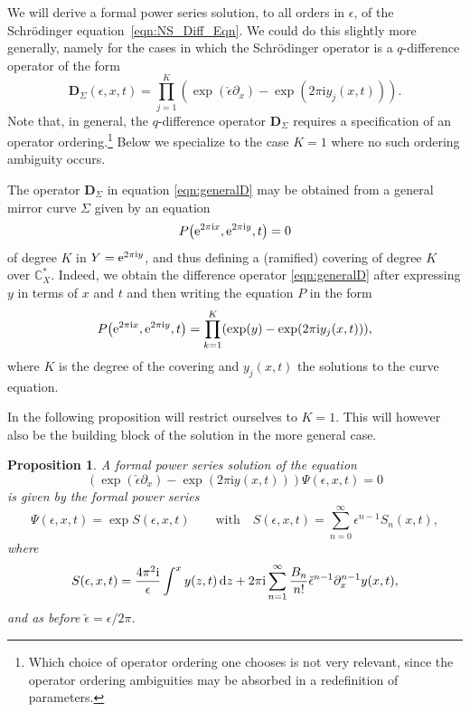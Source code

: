 \documentclass[pdftex]{sigma}
\numberwithin{equation}{section}
\newtheorem{Proposition}[Theorem]{Proposition}
 { \theoremstyle{definition}
\newtheorem{Definition}[Theorem]{Definition}
\newtheorem{Note}[Theorem]{Note}
\newtheorem{Example}[Theorem]{Example}
\newtheorem{Remark}[Theorem]{Remark} }
\begin{document}
We will derive a formal power series solution, to all orders in $\epsilon$, of the Schr\"odinger equation~\eqref{eqn:NS_Diff_Eqn}. We could do this slightly more generally, namely for the cases in which the Schr\"odinger operator is a $q$-difference operator of the form
\begin{equation}\label{eqn:generalD}
\mathbf{D}_\Sigma (\epsilon,x,t) = \prod_{j=1}^{K} (\exp(\check{\epsilon}\partial_x)-\exp(2\pi \mathrm{i} y_j(x,t)) ).
\end{equation}
Note that, in general, the $q$-difference operator $\mathbf{D}_\Sigma$ requires a specification of an operator ordering.\footnote{Which choice of operator ordering one chooses is not very relevant, since the operator ordering ambiguities may be absorbed in a redefinition of parameters.} Below we specialize to the case $K=1$ where no such ordering ambiguity occurs.

The operator $\mathbf{D}_\Sigma$ in equation \eqref{eqn:generalD} may be obtained from a general mirror curve $\Sigma$ given by an equation
\begin{equation*} P\big({\rm e}^{2\pi \mathrm{i} x},{\rm e}^{2\pi \mathrm{i} y},t\big)=0\end{equation*}
of degree $K$ in $Y={\rm e}^{2\pi \mathrm{i} y}$, and thus defining a (ramified) covering of degree $K$ over $\mathbb{C}^*_X$. Indeed, we obtain the difference operator \eqref{eqn:generalD} after expressing $y$ in terms of $x$ and $t$ and then writing the equation $P$ in the form
\begin{equation*}%
 P\big({\rm e}^{2\pi \mathrm{i} x},{\rm e}^{2\pi \mathrm{i} y},t\big)= \prod_{k=1}^K (\exp(y)-\exp(2\pi \mathrm{i} y_j(x,t))),
\end{equation*}
where $K$ is the degree of the covering and $y_j(x,t)$ the solutions to the curve equation.

In the following proposition will restrict ourselves to $K=1$. This will however also be the building block of the solution in the more general case.
\begin{Proposition}\label{prop:Sasymp}
A formal power series solution of the equation
\begin{equation}\label{eq:openwaveeq}
 (\exp(\check{\epsilon}\partial_x)-\exp(2\pi \mathrm{i} y(x,t))) \Psi(\epsilon,x,t)=0
\end{equation}
is given by the formal power series
\begin{equation*}
 \Psi(\epsilon,x,t)= \exp S(\epsilon,x,t) \qquad \mathrm{with} \quad S(\epsilon,x,t)=\sum_{n=0}^{\infty} \epsilon^{n-1} S_n(x,t),
\end{equation*}
where
\begin{equation}\label{eqn:Sformal}
 S(\epsilon,x,t)= \frac{4\pi^2 \mathrm{i}}{\epsilon} \int^x y(z,t) \,{\rm d}z + 2\pi \mathrm{i} \sum_{n=1}^{\infty} \frac{B_n}{n!} \check{\epsilon}^{n-1} \partial_x^{n-1} y(x,t),
\end{equation}
and as before $\check{\epsilon}=\epsilon/2\pi$.
\end{Proposition}
\end{document}

